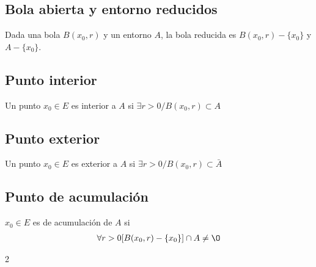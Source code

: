 \documentclass{article}
\begin{document}
\begin{multicols}{2}
    \subsection{Bola abierta y entorno reducidos}
    Dada una bola $B(x_{0},r)$ y un entorno $A$, la bola reducida es $B(x_{0},r)-\{ x_{0} \}$ y
    $A-\{ x_{0} \}$.
    \subsection{Punto interior}
    Un punto $x_{0} \in E$ es interior a $A$ si $\exists r > 0 / B(x_{0},r) \subset A$
    \subsection{Punto exterior}
    Un punto $x_{0} \in E$ es exterior a $A$ si $\exists r > 0 / B(x_{0},r) \subset \bar{A}$
    \subsection{Punto de acumulación}
    $x_{0} \in E$ es de acumulación de $A$ si
    \begin{equation}
        \begin{split}
            \forall r > 0 [B(x_{0},r)-\{ x_{0} \}] \cap A \neq \O
        \end{split}
    \end{equation}
\end{multicols}{2}
\end{document}
